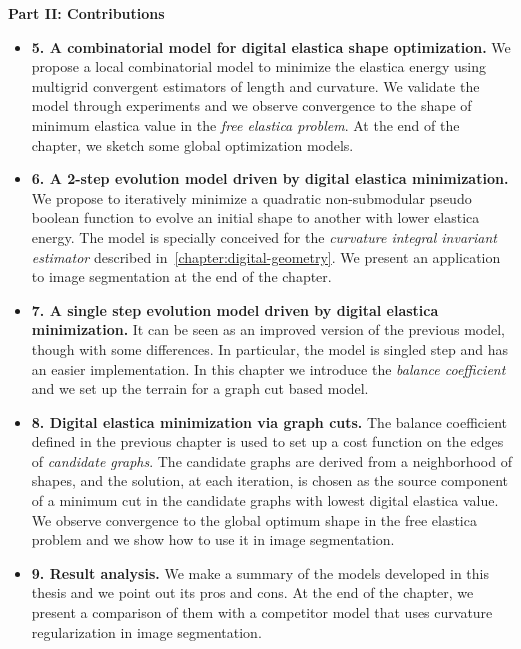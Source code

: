 \textbf{Part II: Contributions}
\begin{itemize}
\item[]{\textbf{5. A combinatorial model for digital elastica shape optimization.} We propose a local combinatorial model to minimize the elastica energy using multigrid convergent estimators of length and curvature. We validate the model through experiments and we observe convergence to the shape of minimum elastica value in the \emph{free elastica problem}. At the end of the chapter, we sketch some global optimization models.}
\item[]{\textbf{6. A 2-step evolution model driven by digital elastica minimization.} We propose to iteratively minimize a quadratic non-submodular pseudo boolean function to evolve an initial shape to another with lower elastica energy. The model is specially conceived for the \emph{curvature integral invariant estimator} described in~\cref{chapter:digital-geometry}. We present an application to image segmentation at the end of the chapter. }
\item[]{\textbf{7. A single step evolution model driven by digital elastica minimization.} It can be seen as an improved version of the previous model, though with some differences. In particular, the model is singled step and has an easier implementation. In this chapter we introduce the \emph{balance coefficient} and we set up the terrain for a graph cut based model.}
\item[]{\textbf{8. Digital elastica minimization via graph cuts.} The balance coefficient defined in the previous chapter is used to set up a cost function on the edges of \emph{candidate graphs}. The candidate graphs are derived from a neighborhood of shapes, and the solution, at each iteration, is chosen as the source component of a minimum cut in the candidate graphs with lowest digital elastica value. We observe convergence to the global optimum shape in the free elastica problem and we show how to use it in image segmentation. }
\item[]{\textbf{9. Result analysis.} We make a summary of the models developed in this thesis and we point out its pros and cons. At the end of the chapter, we present a comparison of them with a competitor model that uses curvature regularization in image segmentation. }
\end{itemize}

